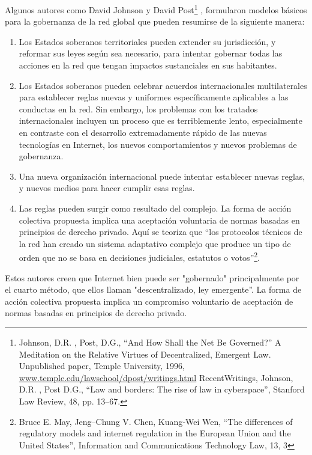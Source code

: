 \documentclass[12pt]{report} %
\begin{document}
Algunos autores como David Johnson y David Post\footnote{Johnson, D.R. , Post, D.G.,  “And How Shall the Net Be Governed?” A Meditation on the Relative Virtues of Decentralized, Emergent Law. Unpublished paper, Temple University, 1996, \url{www.temple.edu/lawschool/dpost/writings.html} RecentWritings,  Johnson, D.R. , Post D.G., “Law and borders: The rise of law in cyberspace”, Stanford Law Review, 48, pp. 13–67.} , formularon modelos  básicos para la gobernanza de la red global que pueden resumirse de la siguiente manera:



\begin{enumerate}
  \item Los Estados soberanos territoriales pueden extender su jurisdicción, y reformar sus leyes según sea necesario, para intentar gobernar todas 
  las acciones en la red que tengan impactos sustanciales en sus habitantes. 
  
  \item Los Estados soberanos pueden celebrar acuerdos internacionales multilaterales para establecer reglas nuevas y uniformes específicamente aplicables a las conductas en la red. Sin embargo, los problemas con los tratados internacionales incluyen un proceso que es terriblemente lento, especialmente en contraste con el desarrollo extremadamente rápido de las nuevas tecnologías en Internet, los nuevos comportamientos y nuevos problemas de gobernanza.
  
  \item Una nueva organización internacional puede intentar establecer nuevas reglas, y nuevos medios para hacer cumplir esas reglas.

  \item Las reglas pueden surgir como resultado del complejo. La forma de acción colectiva propuesta implica una aceptación voluntaria de normas basadas en principios de derecho privado. Aquí se teoriza que “los protocolos técnicos de la red han creado un sistema adaptativo complejo que produce un tipo de orden que no se basa en decisiones judiciales, estatutos o votos”\footnote{Bruce E. May, Jeng--Chung V. Chen, Kuang‐Wei Wen, “The differences of regulatory models and internet regulation in the European Union and the United States”, Information and Communications Technology Law, 13, 3}.  
  
\end{enumerate}


Estos autores creen que Internet bien puede ser "gobernado" principalmente por el cuarto método, que ellos llaman "descentralizado, ley emergente”. La forma de acción colectiva propuesta implica un compromiso voluntario de aceptación de normas basadas en principios de derecho privado. 
\end{document}
